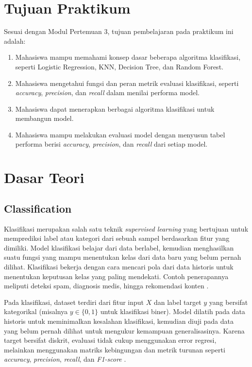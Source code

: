 \documentclass[a4paper,oneside,12pt]{report}
\begin{document}
\setcounter{page}{3}

\chapter[Tujuan Praktikum]{Tujuan Praktikum}
Sesuai dengan Modul Pertemuan 3, tujuan pembelajaran pada praktikum ini adalah:
\begin{enumerate}
   \item Mahasiswa mampu memahami konsep dasar beberapa algoritma klasifikasi, seperti Logistic Regression, KNN, Decision Tree, dan Random Forest.
   \item Mahasiswa mengetahui fungsi dan peran metrik evaluasi klasifikasi, seperti \textit{accuracy}, \textit{precision}, dan \textit{recall} dalam menilai performa model.
   \item Mahasiswa dapat menerapkan berbagai algoritma klasifikasi untuk membangun model.
   \item Mahasiswa mampu melakukan evaluasi model dengan menyusun tabel performa berisi \textit{accuracy}, \textit{precision}, dan \textit{recall} dari setiap model.
\end{enumerate}

\clearpage

\chapter{Dasar Teori}

\section{Classification}
Klasifikasi merupakan salah satu teknik \textit{supervised learning} yang bertujuan untuk memprediksi label atau kategori dari sebuah sampel berdasarkan fitur yang dimiliki. Model klasifikasi belajar dari data berlabel, kemudian menghasilkan suatu fungsi yang mampu menentukan kelas dari data baru yang belum pernah dilihat. Klasifikasi bekerja dengan cara mencari pola dari data historis untuk menentukan keputusan kelas yang paling mendekati. Contoh penerapannya meliputi deteksi spam, diagnosis medis, hingga rekomendasi konten \cite{han2022,google-ml-categorical,trivusi-aimldl,ibm-classification}.

Pada klasifikasi, dataset terdiri dari fitur input $X$ dan label target $y$ yang bersifat kategorikal (misalnya $y \in \{0,1\}$ untuk klasifikasi biner). Model dilatih pada data historis untuk meminimalkan kesalahan klasifikasi, kemudian diuji pada data yang belum pernah dilihat untuk mengukur kemampuan generalisasinya. Karena target bersifat diskrit, evaluasi tidak cukup menggunakan error regresi, melainkan menggunakan matriks kebingungan dan metrik turunan seperti \textit{accuracy}, \textit{precision}, \textit{recall}, dan \textit{F1-score} \cite{sklearn-metrics,ibm-eda,dicoding-workflow}.
\end{document}
